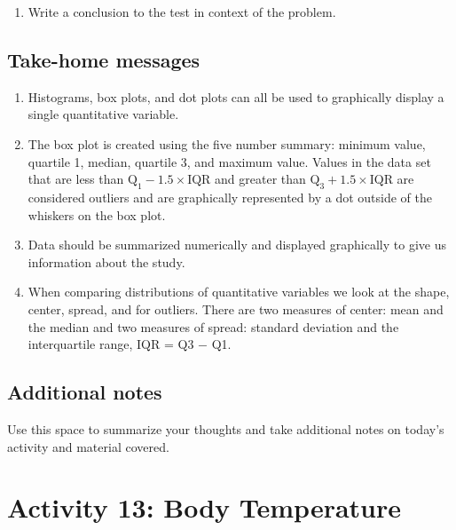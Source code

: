 \documentclass[
]{report}
\providecommand{\tightlist}{%
  \setlength{\itemsep}{0pt}\setlength{\parskip}{0pt}}
\begin{document}
\vspace{1in}

\begin{enumerate}
\def\labelenumi{\arabic{enumi}.}
\setcounter{enumi}{10}
\tightlist
\item
  Write a conclusion to the test in context of the problem.
\end{enumerate}

\vspace{1in}

\subsection{Take-home messages}\label{take-home-messages-1}

\begin{enumerate}
\def\labelenumi{\arabic{enumi}.}
\item
  Histograms, box plots, and dot plots can all be used to graphically display a single quantitative variable.
\item
  The box plot is created using the five number summary: minimum value, quartile 1, median, quartile 3, and maximum value. Values in the data set that are less than \(\text{Q}_1 - 1.5\times \text{IQR}\) and greater than \(\text{Q}_3 + 1.5\times \text{IQR}\) are considered outliers and are graphically represented by a dot outside of the whiskers on the box plot.
\item
  Data should be summarized numerically and displayed graphically to give us information about the study.
\item
  When comparing distributions of quantitative variables we look at the shape, center, spread, and for outliers. There are two measures of center: mean and the median and two measures of spread: standard deviation and the interquartile range, IQR = Q3 \(-\) Q1.
\end{enumerate}

\subsection{Additional notes}\label{additional-notes-1}

Use this space to summarize your thoughts and take additional notes on today's activity and material covered.

\newpage

\section{Activity 13: Body Temperature}\label{activity-13-body-temperature}
\end{document}

